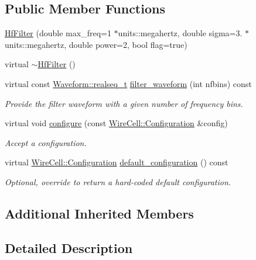 \subsection*{Public Member Functions}
\begin{DoxyCompactItemize}
\item 
\hyperlink{class_wire_cell_1_1_sig_proc_1_1_hf_filter_a5a68adda61f36ff2653d418c64a7ae42}{Hf\+Filter} (double max\+\_\+freq=1 $\ast$units\+::megahertz, double sigma=3. $\ast$units\+::megahertz, double power=2, bool flag=true)
\item 
virtual \hyperlink{class_wire_cell_1_1_sig_proc_1_1_hf_filter_ab04d5fbb405dd807bd0c03f3fce8b745}{$\sim$\+Hf\+Filter} ()
\item 
virtual const \hyperlink{namespace_wire_cell_1_1_waveform_a479175e541c8545e87cd8063b74b6956}{Waveform\+::realseq\+\_\+t} \hyperlink{class_wire_cell_1_1_sig_proc_1_1_hf_filter_a4b34ce856b103ea1cfff4d418b1aae6d}{filter\+\_\+waveform} (int nfbins) const
\begin{DoxyCompactList}\small\item\em Provide the filter waveform with a given number of frequency bins. \end{DoxyCompactList}\item 
virtual void \hyperlink{class_wire_cell_1_1_sig_proc_1_1_hf_filter_af7320d10ac57a7a3526542a31a393b26}{configure} (const \hyperlink{namespace_wire_cell_a9f705541fc1d46c608b3d32c182333ee}{Wire\+Cell\+::\+Configuration} \&config)
\begin{DoxyCompactList}\small\item\em Accept a configuration. \end{DoxyCompactList}\item 
virtual \hyperlink{namespace_wire_cell_a9f705541fc1d46c608b3d32c182333ee}{Wire\+Cell\+::\+Configuration} \hyperlink{class_wire_cell_1_1_sig_proc_1_1_hf_filter_a490d55260745515290505cef11ca8ff1}{default\+\_\+configuration} () const
\begin{DoxyCompactList}\small\item\em Optional, override to return a hard-\/coded default configuration. \end{DoxyCompactList}\end{DoxyCompactItemize}
\subsection*{Additional Inherited Members}


\subsection{Detailed Description}


